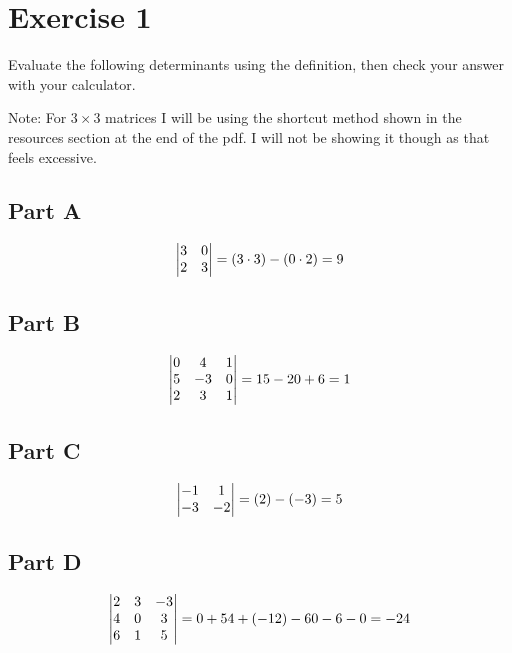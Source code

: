 \section*{Exercise 1}

Evaluate the following determinants using the definition, then check your answer with your calculator.

Note: For $3 \times 3$ matrices I will be using the shortcut method shown in the resources section at the end of the pdf. I will not be showing it though as that feels excessive. 

\subsection*{Part A}

\[
	\genericmat{v}{3&0\\2&3} = (3 \cdot 3) - (0 \cdot 2) = 9
\]

\subsection*{Part B}

\[
	\genericmat{v}{0&4&1\\5&-3&0\\2&3&1} = 15 - 20 + 6 = 1
\]

\subsection*{Part C}

\[
	\genericmat{v}{-1&1\\-3&-2} = (2) - (-3) = 5
\]

\subsection*{Part D}

\[
	\genericmat{v}{2&3&-3\\4&0&3\\6&1&5} = 0 + 54 + (-12) - 60 - 6 - 0 = -24
\]
